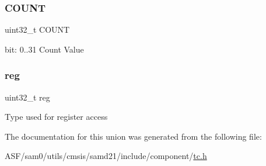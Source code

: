 \subsubsection{\texorpdfstring{COUNT}{COUNT}}
{\footnotesize\ttfamily uint32\+\_\+t C\+O\+U\+NT}

bit\+: 0..31 Count Value \mbox{\label{union_t_c___c_o_u_n_t32___c_o_u_n_t___type_a6b91636401516a477989a336376d7b40}} 
\subsubsection{\texorpdfstring{reg}{reg}}
{\footnotesize\ttfamily uint32\+\_\+t reg}

Type used for register access 

The documentation for this union was generated from the following file\+:\begin{DoxyCompactItemize}
\item 
A\+S\+F/sam0/utils/cmsis/samd21/include/component/\mbox{\hyperlink{utils_2cmsis_2samd21_2include_2component_2tc_8h}{tc.\+h}}\end{DoxyCompactItemize}
